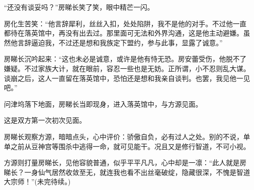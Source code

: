 \begin{this_body}
“还没有谈妥吗？”房睇长笑了笑，眼中精芒一闪。

房化生苦笑：“他言辞犀利，丝丝入扣，处处陷阱，我不是他的对手。不过他一直都待在落英馆中，再没有出去过。那里面可无法和外界沟通，这是他主动避嫌。虽然他言辞逼迫我，不过还是想和我族定下盟约，参与此事，显露了诚意。”

房睇长沉吟起来：“这也未必是诚意，或许是他有恃无恐。房安蕾受伤，他脱不了嫌疑。不过家族大计，就在眼前，容忍一些也是无妨。正所谓，小不忍则乱大谋。谈崩之后，这人一直留在落英馆中，恐怕还是想和我亲自谈判。也罢，我见他一见吧。”

问津坞落下地面，房睇长当即现身，进入落英馆中，与方源见面。

这是双方第一次初次见面。

房睇长观察方源，暗暗点头，心中评价：骄傲自负，必有过人之处。别的不说，单单之前从豆神宫等围杀中逃得一命，就可见能干。况且又是修行智道，不可小视。

方源则打量房睇长，见他容貌普通，似乎平平凡凡，心中却是一凛：“此人就是房睇长？一身仙气居然收敛至无，就连我也看不出丝毫破绽，隐藏很深，不愧是智道大宗师！”(未完待续。)

\end{this_body}

